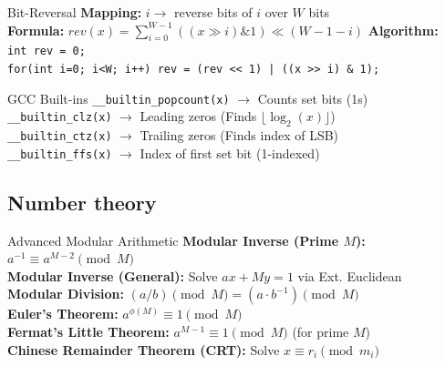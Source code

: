 \documentclass[10pt,a4paper,twocolumn]{article}
\begin{document}
    \begin{bitbox}{Bit-Reversal}
        \textbf{Mapping:} $i \rightarrow$ reverse bits of $i$ over $W$ bits \\
        \textbf{Formula:} $rev(x) = \sum_{i=0}^{W-1} ((x \gg i) \& 1) \ll (W-1-i)$
        \textbf{Algorithm:} \\
        \texttt{int rev = 0;} \\
        \texttt{for(int i=0; i<W; i++) rev = (rev << 1) | ((x >> i) \& 1);}
    \end{bitbox}
    \begin{bitbox}{GCC Built-ins}
        \texttt{\_\_builtin\_popcount(x)} $\rightarrow$ Counts set bits (1s) \\
        \texttt{\_\_builtin\_clz(x)} $\rightarrow$ Leading zeros (Finds $\lfloor \log_2(x) \rfloor$) \\
        \texttt{\_\_builtin\_ctz(x)} $\rightarrow$ Trailing zeros (Finds index of LSB) \\
        \texttt{\_\_builtin\_ffs(x)} $\rightarrow$ Index of first set bit (1-indexed)
    \end{bitbox}
    
	\subsection{Number theory}
    \begin{bitbox}{Advanced Modular Arithmetic}
        \textbf{Modular Inverse (Prime $M$):} $a^{-1} \equiv a^{M-2} \pmod M$ \\
        \textbf{Modular Inverse (General):} Solve $ax + My = 1$ via Ext. Euclidean \\
        \textbf{Modular Division:} $(a / b) \pmod M = (a \cdot b^{-1}) \pmod M$ \\
        \textbf{Euler's Theorem:} $a^{\phi(M)} \equiv 1 \pmod M$ \\
        \textbf{Fermat's Little Theorem:} $a^{M-1} \equiv 1 \pmod M$ (for prime $M$) \\
        \textbf{Chinese Remainder Theorem (CRT):} Solve $x \equiv r_i \pmod{m_i}$ \\
    \end{bitbox}
\end{document}
